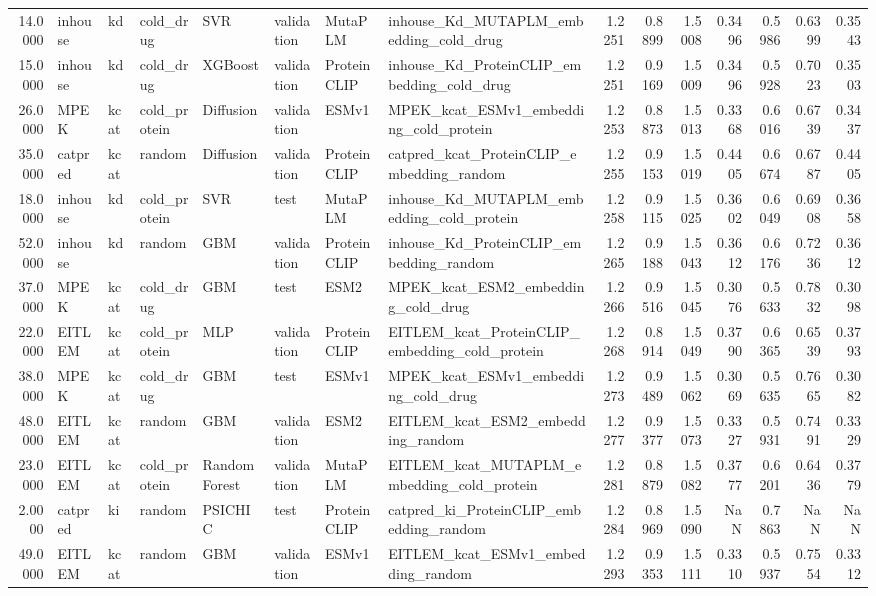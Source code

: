 \begin{tabular}{rlllllllrrrrrrr}
14.0000 & inhouse & kd & cold_drug & SVR & validation & MutaPLM & inhouse_Kd_MUTAPLM_embedding_cold_drug & 1.2251 & 0.8899 & 1.5008 & 0.3496 & 0.5986 & 0.6399 & 0.3543 \\
15.0000 & inhouse & kd & cold_drug & XGBoost & validation & ProteinCLIP & inhouse_Kd_ProteinCLIP_embedding_cold_drug & 1.2251 & 0.9169 & 1.5009 & 0.3496 & 0.5928 & 0.7023 & 0.3503 \\
26.0000 & MPEK & kcat & cold_protein & Diffusion & validation & ESMv1 & MPEK_kcat_ESMv1_embedding_cold_protein & 1.2253 & 0.8873 & 1.5013 & 0.3368 & 0.6016 & 0.6739 & 0.3437 \\
35.0000 & catpred & kcat & random & Diffusion & validation & ProteinCLIP & catpred_kcat_ProteinCLIP_embedding_random & 1.2255 & 0.9153 & 1.5019 & 0.4405 & 0.6674 & 0.6787 & 0.4405 \\
18.0000 & inhouse & kd & cold_protein & SVR & test & MutaPLM & inhouse_Kd_MUTAPLM_embedding_cold_protein & 1.2258 & 0.9115 & 1.5025 & 0.3602 & 0.6049 & 0.6908 & 0.3658 \\
52.0000 & inhouse & kd & random & GBM & validation & ProteinCLIP & inhouse_Kd_ProteinCLIP_embedding_random & 1.2265 & 0.9188 & 1.5043 & 0.3612 & 0.6176 & 0.7236 & 0.3612 \\
37.0000 & MPEK & kcat & cold_drug & GBM & test & ESM2 & MPEK_kcat_ESM2_embedding_cold_drug & 1.2266 & 0.9516 & 1.5045 & 0.3076 & 0.5633 & 0.7832 & 0.3098 \\
22.0000 & EITLEM & kcat & cold_protein & MLP & validation & ProteinCLIP & EITLEM_kcat_ProteinCLIP_embedding_cold_protein & 1.2268 & 0.8914 & 1.5049 & 0.3790 & 0.6365 & 0.6539 & 0.3793 \\
38.0000 & MPEK & kcat & cold_drug & GBM & test & ESMv1 & MPEK_kcat_ESMv1_embedding_cold_drug & 1.2273 & 0.9489 & 1.5062 & 0.3069 & 0.5635 & 0.7665 & 0.3082 \\
48.0000 & EITLEM & kcat & random & GBM & validation & ESM2 & EITLEM_kcat_ESM2_embedding_random & 1.2277 & 0.9377 & 1.5073 & 0.3327 & 0.5931 & 0.7491 & 0.3329 \\
23.0000 & EITLEM & kcat & cold_protein & Random Forest & validation & MutaPLM & EITLEM_kcat_MUTAPLM_embedding_cold_protein & 1.2281 & 0.8879 & 1.5082 & 0.3777 & 0.6201 & 0.6436 & 0.3779 \\
2.0000 & catpred & ki & random & PSICHIC & test & ProteinCLIP & catpred_ki_ProteinCLIP_embedding_random & 1.2284 & 0.8969 & 1.5090 & NaN & 0.7863 & NaN & NaN \\
49.0000 & EITLEM & kcat & random & GBM & validation & ESMv1 & EITLEM_kcat_ESMv1_embedding_random & 1.2293 & 0.9353 & 1.5111 & 0.3310 & 0.5937 & 0.7554 & 0.3312 \\

\end{tabular}

